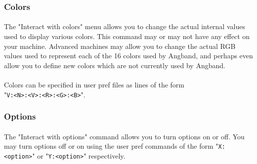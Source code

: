 \subsubsection{Colors}
\paragraph{}The "Interact with colors" menu allows you to change the
actual internal values used to display various colors. This command may
or may not have any effect on your machine. Advanced machines may allow
you to change the actual RGB values used to represent each of the 16
colors used by Angband, and perhaps even allow you to define new colors
which are not currently used by Angband.

\paragraph{}Colors can be specified in user pref files as lines of the
form \\ "\verb+V:<N>:<V>:<R>:<G>:<B>+".

\subsubsection{Options}
\paragraph{}The "Interact with options" command allows you to turn
options on or off. You may turn options off or on using the user pref
commands of the form "\verb+X:<option>+" or "\verb+Y:<option>+" respectively.

